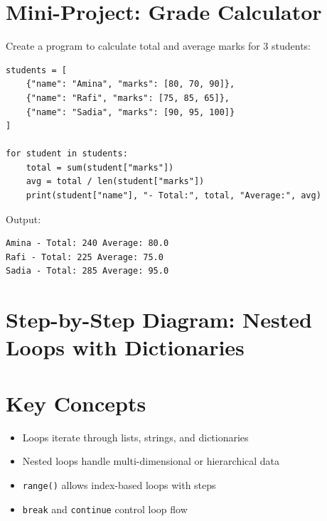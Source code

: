 \section{Mini-Project: Grade Calculator}

Create a program to calculate total and average marks for 3 students:

\begin{verbatim}
students = [
    {"name": "Amina", "marks": [80, 70, 90]},
    {"name": "Rafi", "marks": [75, 85, 65]},
    {"name": "Sadia", "marks": [90, 95, 100]}
]

for student in students:
    total = sum(student["marks"])
    avg = total / len(student["marks"])
    print(student["name"], "- Total:", total, "Average:", avg)
\end{verbatim}

Output:

\begin{verbatim}
Amina - Total: 240 Average: 80.0
Rafi - Total: 225 Average: 75.0
Sadia - Total: 285 Average: 95.0
\end{verbatim}

\section{Step-by-Step Diagram: Nested Loops with Dictionaries}

\begin{center}
\end{center}

\section{Key Concepts}

\begin{itemize}
    \item Loops iterate through lists, strings, and dictionaries  
    \item Nested loops handle multi-dimensional or hierarchical data  
    \item \texttt{range()} allows index-based loops with steps  
    \item \texttt{break} and \texttt{continue} control loop flow  
\end{itemize}


